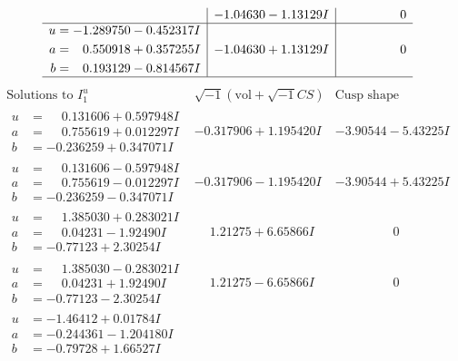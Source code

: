 \documentclass[1p]{elsarticle_modified}
\theoremstyle{definition}
\newcommand{\I}{\sqrt{-1}}
\begin{document}
$$\begin{array}{c|c|c}
 & -1.04630 - 1.13129 I & \phantom{-0.000000 } 0 \\ \hline\begin{aligned}
u &= -1.289750 - 0.452317 I \\
a &= \phantom{-}0.550918 + 0.357255 I \\
b &= \phantom{-}0.193129 - 0.814567 I\end{aligned}
 & -1.04630 + 1.13129 I & \phantom{-0.000000 } 0\\
 \hline 
 \end{array}$$\newpage$$\begin{array}{c|c|c}  
\text{Solutions to }I^u_{1}& \I (\text{vol} + \sqrt{-1}CS) & \text{Cusp shape}\\
 \hline 
\begin{aligned}
u &= \phantom{-}0.131606 + 0.597948 I \\
a &= \phantom{-}0.755619 + 0.012297 I \\
b &= -0.236259 + 0.347071 I\end{aligned}
 & -0.317906 + 1.195420 I & -3.90544 - 5.43225 I \\ \hline\begin{aligned}
u &= \phantom{-}0.131606 - 0.597948 I \\
a &= \phantom{-}0.755619 - 0.012297 I \\
b &= -0.236259 - 0.347071 I\end{aligned}
 & -0.317906 - 1.195420 I & -3.90544 + 5.43225 I \\ \hline\begin{aligned}
u &= \phantom{-}1.385030 + 0.283021 I \\
a &= \phantom{-}0.04231 - 1.92490 I \\
b &= -0.77123 + 2.30254 I\end{aligned}
 & \phantom{-}1.21275 + 6.65866 I & \phantom{-0.000000 } 0 \\ \hline\begin{aligned}
u &= \phantom{-}1.385030 - 0.283021 I \\
a &= \phantom{-}0.04231 + 1.92490 I \\
b &= -0.77123 - 2.30254 I\end{aligned}
 & \phantom{-}1.21275 - 6.65866 I & \phantom{-0.000000 } 0 \\ \hline\begin{aligned}
u &= -1.46412 + 0.01784 I \\
a &= -0.244361 - 1.204180 I \\
b &= -0.79728 + 1.66527 I\end{aligned}

\end{array}$$
\end{document}
